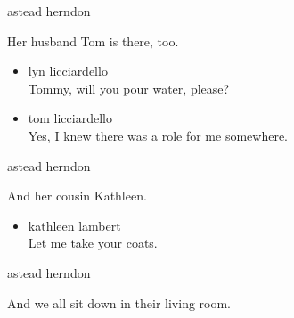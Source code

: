 astead herndon

Her husband Tom is there, too.

\begin{itemize}
\item
  lyn licciardello\\
  Tommy, will you pour water, please?
\item
  tom licciardello\\
  Yes, I knew there was a role for me somewhere.
\end{itemize}

astead herndon

And her cousin Kathleen.

\begin{itemize}
\tightlist
\item
  kathleen lambert\\
  Let me take your coats.
\end{itemize}

astead herndon

And we all sit down in their living room.

